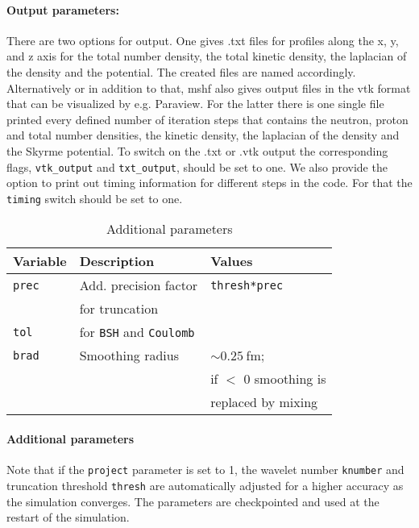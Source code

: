 \documentclass[3p]{elsarticle}
\begin{document}
\paragraph{Output parameters:} There are two options for output. One gives .txt files for profiles along the x, y, and z axis for the total number density, the total kinetic density, the laplacian of the density and the potential. The created files are named accordingly. Alternatively or in addition to that, {\sc mshf} also gives output files in the vtk format that can be visualized by e.g. Paraview. For the latter there is one single file printed every defined number of iteration steps that contains the neutron, proton and total number densities, the kinetic density, the laplacian of the density and the Skyrme potential. To switch on the .txt or .vtk output the corresponding flags, {\tt vtk\_output} and {\tt txt\_output}, should be set to one. We also provide the option to print out timing information for different steps in the code. For that the {\tt timing} switch should be set to one.   
\begin{table}
\caption{Additional parameters}
\begin{tabular*}{\columnwidth}{ l l l}
\hline
\hline
Variable & Description & Values\\
\hline
\texttt{prec}                                & Add. precision factor                                           &\texttt{thresh*prec}\\
                                                  & for truncation                                                                                     & \\
\texttt{tol}                                   & for \texttt{BSH} and \texttt{Coulomb}                     & \\
\texttt{brad}                                & Smoothing radius                                                         & $\sim 0.25\:$fm; \\
& & if $<$ 0 smoothing is\\
                                                 &                                                                                                           & replaced by mixing \\                                           

\hline
\hline
\end{tabular*}
\label{table5}
\end{table}
\paragraph{Additional parameters}
Note that if the \texttt{project} parameter is set to 1, the wavelet number \texttt{knumber} and truncation threshold \texttt{thresh} are automatically adjusted for a higher accuracy as the simulation converges. The parameters are checkpointed and used at the restart of the simulation.
\end{document}
